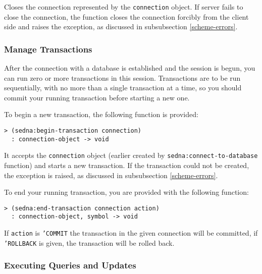 \documentclass[a4paper,12pt]{article}
\begin{document}
Closes the connection represented by the \texttt{connection} object. If server
fails to close the connection, the function closes the connection forcibly from
the client side and raises the exception, as discussed in subsubsection
\ref{scheme-errors}.


\subsubsection{Manage Transactions}

After the connection with a database is established and the session is begun,
you can run zero or more transactions in this session. Transactions are to be
run sequentially, with no more than a single transaction at a time, so you
should commit your running transaction before starting a new one.

To begin a new transaction, the following function is provided:

\begin{verbatim}
> (sedna:begin-transaction connection)
  : connection-object -> void
\end{verbatim}

It accepts the \texttt{connection} object (earlier created by
\texttt{sedna:connect-to-database} function) and starts a new transaction. If
the transaction could not be created, the exception is raised, as discussed in
subsubsection \ref{scheme-errors}.

To end your running transaction, you are provided with the following function:

\begin{verbatim}
> (sedna:end-transaction connection action)
  : connection-object, symbol -> void
\end{verbatim}

If \texttt{action} is \texttt{'COMMIT} the transaction in the given connection
will be committed, if \texttt{'ROLLBACK} is given, the transaction will be
rolled back.


\subsubsection{Executing Queries and Updates}
\end{document}
